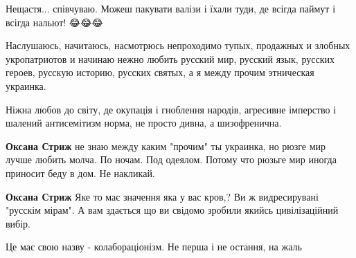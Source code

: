 \begin{itemize}
 
Нещастя... співчуваю. Можеш пакувати валізи і їхали туди, де всігда паймут і
всігда нальют! 😂😂😂

 
Наслушаюсь, начитаюсь, насмотрюсь непроходимо тупых, продажных и злобных
укропатриотов и начинаю нежно любить русский мир, русский язык, русских героев,
русскую историю, русских святых, а я между прочим этническая украинка.

\begin{itemize}
 
Ніжна любов до світу, де окупація і гноблення народів, агресивне імперство і шалений антисемітизм норма, не просто дивна, а шизофренична.

 
\textbf{Оксана Стриж} не знаю между каким "прочим" ты украинка, но рюзге мир лучше любить молча. По ночам. Под одеялом. Потому что рюзьге мир иногда приносит беду в дом. Не накликай.

 
\textbf{Оксана Стриж} Яке то має значення яка у вас кров,? Ви ж видресирувані "русскім мірам". А вам здається що ви свідомо зробили якийсь цивілізаційний вибір.

 
Це має свою назву - колабораціонізм. Не перша і не остання, на жаль

 

\end{itemize}
\end{itemize}
